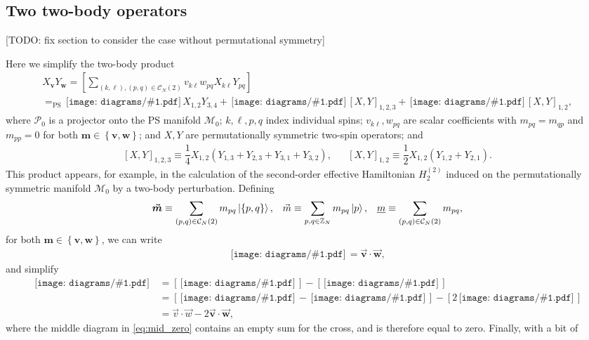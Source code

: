\documentclass[nofootinbib,notitlepage,11pt]{revtex4-2}
\newcommand{\f}[2]{\dfrac{#1}{#2}} %
\newcommand{\p}[1]{\left(#1\right)} %
\renewcommand{\sp}[1]{\left[#1\right]} %
\renewcommand{\set}[1]{\left\{#1\right\}} %
\renewcommand{\c}{\cdot} %
\newcommand{\m}{\bm} %
\renewcommand{\v}{\vec} %
\newcommand{\1}{\mathds{1}}
\newcommand{\C}{\mathcal{C}}
\newcommand{\M}{\mathcal{M}}
\renewcommand{\P}{\mathcal{P}}
\newcommand{\ZZ}{\mathbb{Z}}
\newcommand{\EQPS}{=_{\text{PS}}}
\newcommand{\col}{\underline}
\newcommand{\diagram}[1]
{\,\texttt{[image: diagrams/\#1.pdf]}\,}
\newcommand{\red}[1]{{\color{red} #1}}
\begin{document}
\subsection{Two two-body operators}
\label{sec:two_pair_prod}

\red{[TODO: fix section to consider the case without permutational
  symmetry]}

Here we simplify the two-body product
\begin{multline}
  X_{\m v} Y_{\m w}
  = \sp{\sum_{\p{k,\ell},\p{p,q}\in\C_N\p{2}}
    v_{k\ell} w_{pq} X_{k\ell} Y_{pq}} \\
  \EQPS \diagram{two_body_0} X_{1,2} Y_{3,4}
  + \diagram{two_body_1} \sp{X,Y}_{1,2,3}
  + \diagram{two_body_2} \sp{X,Y}_{1,2},
\end{multline}
where $\P_0$ is a projector onto the PS manifold $\M_0$; $k,\ell,p,q$
index individual spins; $v_{k\ell},w_{pq}$ are scalar coefficients
with $m_{pq}=m_{qp}$ and $m_{pp}=0$ for both $\m m\in\set{\m v,\m w}$;
and $X,Y$ are permutationally symmetric two-spin operators; and
\begin{align}
  \sp{X,Y}_{1,2,3}
  \equiv \f14 X_{1,2}\p{Y_{1,3} + Y_{2,3} + Y_{3,1} + Y_{3,2}},
  &&
  \sp{X,Y}_{1,2} \equiv \f12 X_{1,2} \p{Y_{1,2} + Y_{2,1}}.
\end{align}
This product appears, for example, in the calculation of the
second-order effective Hamiltonian $H_2^{(2)}$ induced on the
permutationally symmetric manifold $\M_0$ by a two-body perturbation.
Defining
\begin{align}
  \v{\m m} \equiv \sum_{\p{p,q}\in\C_N\p{2}} m_{pq} \ket{\set{p,q}},
  &&
  \v m \equiv \sum_{p,q\in\ZZ_N} m_{pq} \ket{p},
  &&
  \col{m} \equiv \sum_{\p{p,q}\in\C_N\p{2}} m_{pq},
\end{align}
for both $\m m\in\set{\m v,\m w}$, we can write
\begin{align}
  \diagram{two_body_2} = \v{\m v} \c\v{\m w},
\end{align}
and simplify
\begin{align}
  \diagram{two_body_1}
  &= \sp{\diagram{two_body_1_o}} - \sp{\diagram{two_body_1_x}} \\
  &= \sp{\diagram{two_body_1_oo} - \diagram{two_body_1_ox}}
  - \sp{2\diagram{two_body_2}} \label{eq:mid_zero} \\
  &= \v v \c \v w - 2 \v{\m v} \c \v{\m w},
\end{align}
where the middle diagram in \eqref{eq:mid_zero} contains an empty sum
for the cross, and is therefore equal to zero.  Finally, with a bit of
\end{document}
